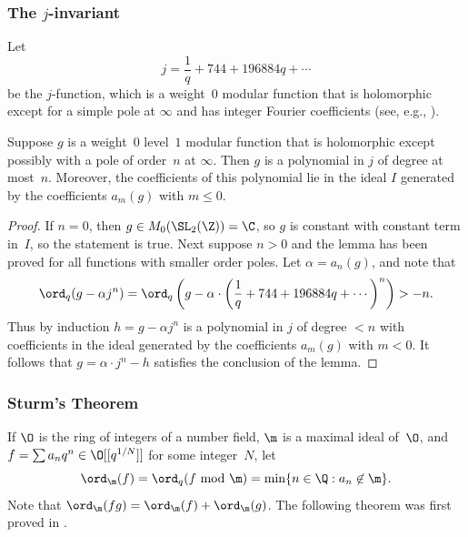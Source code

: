 \subsubsection{The $j$-invariant}
Let
$$
  j = \frac{1}{q} + 744 + 196884 q + \cdots
$$
be the $j$-function, 
which is a weight~$0$ modular function
that is holomorphic except for a simple pole at $\infty$ and
has integer Fourier coefficients (see, e.g., 
\cite[Section~VIII.3.3]{serre:arithmetic}).
\begin{lemma}\label{lem:jform}
Suppose $g$ is a weight~$0$ level~$1$
modular function that is holomorphic except possibly 
with a pole of order~$n$ at $\infty$.
Then $g$ is a polynomial in $j$ of degree at most~$n$.
Moreover, the coefficients of this polynomial lie in 
the ideal $I$ generated by the coefficients $a_m(g)$
with $m\leq  0$.
\end{lemma}
\begin{proof}
If $n=0$, then $g\in M_0(\SL_2(\Z))=\C$, so $g$ is constant with
constant term in~$I$, so the statement is true.  Next suppose $n>0$ and the lemma
has been proved for all functions with smaller order poles.
Let $\alpha = a_n(g)$, and note that
$$
  \ord_q(g - \alpha j^n) = 
  \ord_q\left(g - \alpha \cdot \left(\frac{1}{q} + 744 + 196884 q + \cdots \right)^n\right) > -n.
$$
Thus by induction $h=g - \alpha j^{n}$ is a polynomial in $j$
of degree $<n$ with coefficients in the ideal generated 
by the coefficients $a_m(g)$ with $m< 0$.  It follows
that $g=\alpha \cdot j^n - h$ satisfies the conclusion
of the lemma.
\end{proof}

\subsubsection{Sturm's Theorem}
If $\O$ is the ring of integers of a number field, $\m$
is a maximal ideal of~$\O$, and $f=\sum a_n q^n \in \O[[q^{1/N}]]$
for some integer~$N$,
let
$$
 \ord_\m(f) = \ord_q(f \!\!\mod{\m}) = \min\{n\in\Q : a_n \not\in \m\}.
$$
Note that $\ord_\m(fg) = \ord_\m(f) + \ord_\m(g)$.
The following theorem was first proved in \cite{sturm:cong}.

